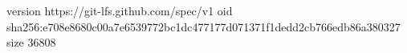 version https://git-lfs.github.com/spec/v1
oid sha256:e708e8680c00a7e6539772bc1dc477177d071371f1dedd2cb766edb86a380327
size 36808
